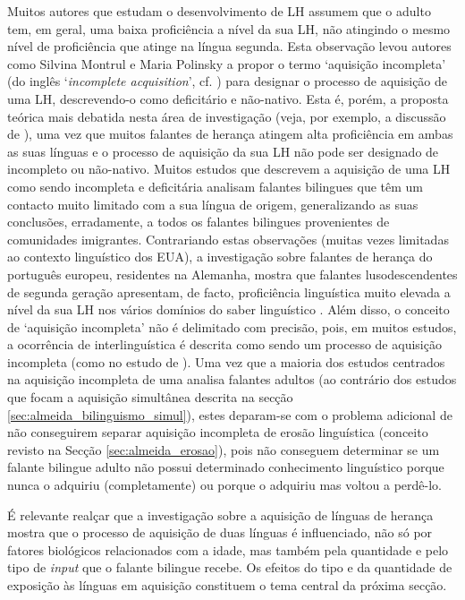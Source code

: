 \documentclass[output=paper]{LSP/langsci}
\begin{document}
Muitos autores que estudam o desenvolvimento de LH assumem que o  adulto tem, em geral, uma baixa proficiência a nível da sua LH, não atingindo o mesmo nível de proficiência que atinge na língua segunda. Esta observação levou autores como Silvina Montrul e Maria Polinsky a propor o termo `aquisição incompleta' (do inglês `\textit{incomplete acquisition}', cf. \citealt{montrul2008,polinsky2008}) para designar o processo de aquisição de uma LH, descrevendo-o como deficitário e não-nativo. Esta é, porém, a proposta teórica mais debatida nesta área de investigação (veja, por exemplo, a discussão de \citealt{kupischrothman2016}), uma vez que muitos falantes de herança atingem alta proficiência em ambas as suas línguas e o processo de aquisição da sua LH não pode ser designado de incompleto ou não-nativo. Muitos estudos que descrevem a aquisição de uma LH como sendo incompleta e deficitária analisam falantes bilingues que têm um contacto muito limitado com a sua língua de origem, generalizando as suas conclusões, erradamente, a todos os falantes bilingues provenientes de comunidades imigrantes. Contrariando estas observações (muitas vezes limitadas ao contexto linguístico dos EUA), a investigação sobre falantes de herança do português europeu, residentes na Alemanha, mostra que falantes lusodescendentes de segunda geração apresentam, de facto, proficiência linguística muito elevada a nível da sua LH nos vários domínios do saber linguístico \citep{barbosaflores2001,santosflores2013}. Além disso, o conceito de ‘aquisição incompleta’ não é delimitado com precisão, pois, em muitos estudos, a ocorrência de  interlinguística é descrita como sendo um processo de aquisição incompleta (como no estudo de \citealt{montrul2008}). Uma vez que a maioria dos estudos centrados na aquisição incompleta de uma  analisa falantes adultos (ao contrário dos estudos que focam a aquisição simultânea descrita na secção \ref{sec:almeida_bilinguismo_simul}), estes deparam-se com o problema adicional de não conseguirem separar aquisição incompleta de erosão linguística (conceito revisto na Secção \ref{sec:almeida_erosao}), pois não conseguem determinar se um falante bilingue adulto não possui determinado conhecimento linguístico porque nunca o adquiriu (completamente) ou porque o adquiriu mas voltou a perdê-lo.\largerpage

É relevante realçar que a investigação sobre a aquisição de línguas de herança mostra que o processo de aquisição de duas línguas é influenciado, não só por fatores biológicos relacionados com a idade, mas também pela quantidade e pelo tipo de \textit{input} que o falante bilingue recebe. Os efeitos do tipo e da quantidade de exposição às línguas em aquisição constituem o tema central da próxima secção.
\end{document}
